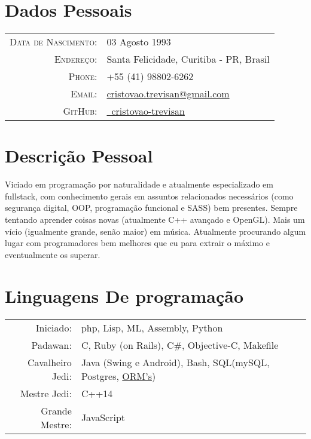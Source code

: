 



\pagestyle{empty} %

\par{\bigskip\par}

\section{Dados Pessoais}
\begin{tabular}{rl}
  \textsc{Data de Nascimento:} & 03 Agosto 1993 \\
  \textsc{Endereço:}	& Santa Felicidade, Curitiba - PR, Brasil \\
  \textsc{Phone:}	& +55 (41) 98802-6262\\
  \textsc{Email:}	& \href{mailto:cristovao.trevisan@gmail.com}{cristovao.trevisan@gmail.com} \\
	\textsc{GitHub:}	& \href{https://github.com/cristovao-trevisan}{\faGithub\ cristovao-trevisan}
\end{tabular}

\section{Descrição Pessoal}

Viciado em programação por naturalidade e atualmente especializado em fullstack,
com conhecimento gerais em assuntos relacionados necessários (como segurança digital,
OOP, programação funcional e SASS) bem presentes. Sempre tentando aprender coisas
novas (atualmente C++ avançado e OpenGL). Mais um vício (igualmente grande, senão
maior) em música. Atualmente procurando algum lugar com programadores bem melhores que eu para extrair o máximo e eventualmente os superar.

\section{Linguagens De programação}
\begin{tabular}{rl}
	Iniciado:& php, Lisp, ML, Assembly, Python\\
	Padawan:& C, Ruby (on Rails), C\#, Objective-C, Makefile\\
	Cavalheiro Jedi:& Java (Swing e Android), Bash, SQL(mySQL, Postgres, \underline{ORM's})\\
	Mestre Jedi:& C++14\\
	Grande Mestre:& JavaScript
\end{tabular}

